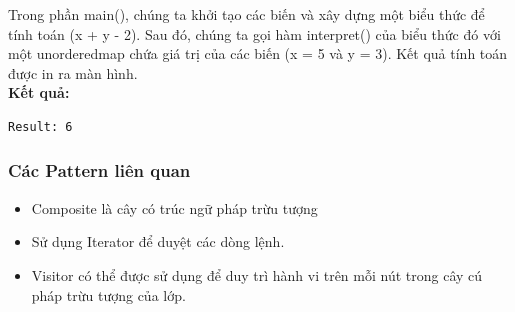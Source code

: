 Trong phần main(), chúng ta khởi tạo các biến và xây dựng một biểu thức để tính toán (x + y - 2). Sau đó, chúng ta gọi hàm interpret() của biểu thức đó với một unorderedmap chứa giá trị của các biến (x = 5 và y = 3). Kết quả tính toán được in ra màn hình.
\\
\newline
\textbf{Kết quả:}
\begin{lstlisting}
Result: 6
\end{lstlisting}
\subsubsection{Các Pattern liên quan}
\begin{itemize}
    \item Composite là cây có trúc ngữ pháp trừu tượng
    \item Sử dụng Iterator để duyệt các dòng lệnh.
    \item Visitor có thể được sử dụng để duy trì hành vi trên mỗi nút trong cây cú pháp trừu tượng của lớp.
\end{itemize}